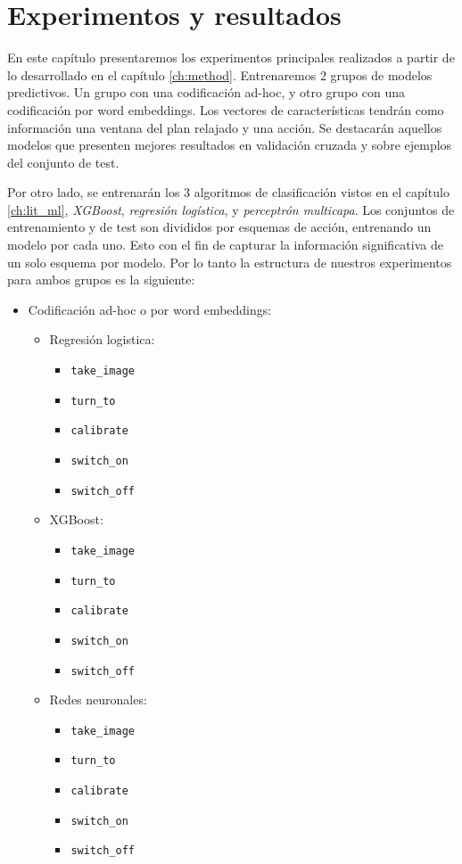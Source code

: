 \chapter{Experimentos y resultados}
\label{ch:results}

En este capítulo presentaremos los experimentos principales realizados a partir
de lo desarrollado en el capítulo \ref{ch:method}. Entrenaremos 2 grupos de
modelos predictivos. Un grupo con una codificación ad-hoc, y otro grupo con una
codificación por word embeddings. Los vectores de características tendrán como
información una ventana del plan relajado y una acción. Se destacarán aquellos
modelos que presenten mejores resultados en validación cruzada y sobre ejemplos
del conjunto de test.

Por otro lado, se entrenarán los 3 algoritmos de clasificación vistos en el
capítulo \ref{ch:lit_ml}, \emph{XGBoost}, \emph{regresión logística}, y
\emph{perceptrón multicapa}. Los conjuntos de entrenamiento y de test son
divididos por esquemas de acción, entrenando un modelo por cada uno. Esto con el
fin de capturar la información significativa de un solo esquema por modelo. Por
lo tanto la estructura de nuestros experimentos para ambos grupos es la
siguiente:

\begin{itemize}
    \item Codificación ad-hoc o por word embeddings:
    \begin{itemize}
        \item Regresión logistica:
        \begin{itemize}
            \item \verb|take_image|
            \item \verb|turn_to|
            \item \verb|calibrate|
            \item \verb|switch_on|
            \item \verb|switch_off|
        \end{itemize}
        \item XGBoost:
        \begin{itemize}
            \item \verb|take_image|
            \item \verb|turn_to|
            \item \verb|calibrate|
            \item \verb|switch_on|
            \item \verb|switch_off|
        \end{itemize}
        \item Redes neuronales:
        \begin{itemize}
            \item \verb|take_image|
            \item \verb|turn_to|
            \item \verb|calibrate|
            \item \verb|switch_on|
            \item \verb|switch_off|
        \end{itemize}
    \end{itemize}
\end{itemize}


